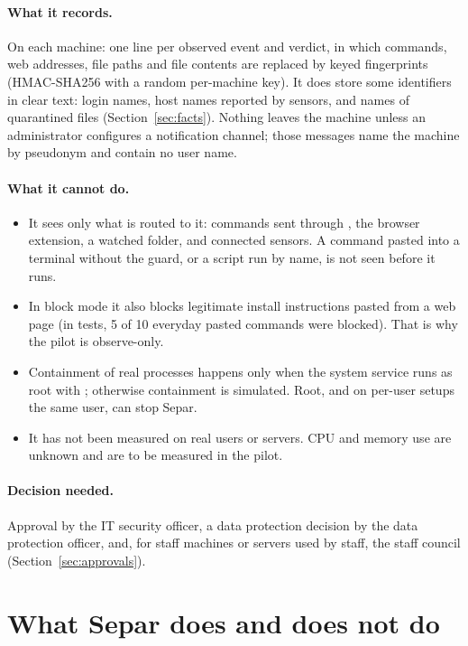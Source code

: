 \documentclass[11pt,a4paper]{article}
\begin{document}
\paragraph{What it records.} On each machine: one line per observed event and verdict, in which
commands, web addresses, file paths and file contents are replaced by keyed fingerprints
(HMAC-SHA256 with a random per-machine key). It does store some identifiers in clear text: login
names, host names reported by sensors, and names of quarantined files (Section~\ref{sec:facts}).
Nothing leaves the machine unless an administrator configures a notification channel; those
messages name the machine by pseudonym and contain no user name.

\paragraph{What it cannot do.}
\begin{itemize}
  \item It sees only what is routed to it: commands sent through , the browser
        extension, a watched folder, and connected sensors. A command pasted into a terminal
        without the guard, or a script run by name, is not seen before it runs.
  \item In block mode it also blocks legitimate install instructions pasted from a web page (in
        tests, 5 of 10 everyday pasted commands were blocked). That is why the pilot is observe-only.
  \item Containment of real processes happens only when the system service runs as root with
        ; otherwise containment is simulated. Root, and on per-user setups the same
        user, can stop Separ.
  \item It has not been measured on real users or servers. CPU and memory use are unknown and are
        to be measured in the pilot.
\end{itemize}

\paragraph{Decision needed.} Approval by the IT security officer, a data protection decision by the
data protection officer, and, for staff machines or servers used by staff, the staff council
(Section~\ref{sec:approvals}).

\section{What Separ does and does not do}
\label{sec:does}
\end{document}
